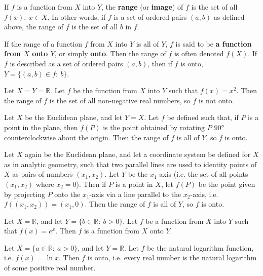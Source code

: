 \documentclass[12pt]{article}
\begin{document}
\begin{defn}
  If $f$ is a function from $X$ into $Y$, the \textbf{range} (or \textbf{image}) of
  $f$ is the set of all $f(x),\ x \in X$. In other words, if $f$ is a set of ordered
  pairs $(a,b)$ as defined above, the range of $f$ is the set of all $b$ in $f$.
\end{defn}

\begin{defn}
  If the range of a function $f$ from $X$ into $Y$ is all of $Y$, $f$ is said to be
  \textbf{a function from $X$ onto $Y$}, or simply \textbf{onto}. Then the range of
  $f$ is often denoted $f(X)$. If $f$ is described as a set of ordered pairs $(a,b)$,
  then if $f$ is onto, $Y = \{(a,b) \in f:\ b\}$.
\end{defn}

\begin{exm}
  Let $X = Y = \mathbb{R}$. Let $f$ be the function from $X$ into $Y$ such that $f(x)
  = x^2$. Then the range of $f$ is the set of all non-negative real numbers, so $f$
  is not onto.
\end{exm}

\begin{exm}
  Let $X$ be the Euclidean plane, and let $Y = X$. Let $f$ be defined such that, if
  $P$ is a point in the plane, then $f(P)$ is the point obtained by rotating $P$
  $90\degree$ counterclockwise about the origin. Then the range of $f$ is all of $Y$,
  so $f$ is onto.
\end{exm}

\begin{exm}
  Let $X$ again be the Euclidean plane, and let a coordinate system be defined for
  $X$ as in analytic geometry, such that two parallel lines are used to identity
  points of $X$ as pairs of numbers $(x_1,x_2)$. Let $Y$ be the $x_1$-axis (i.e. the
  set of all points $(x_1,x_2)$ where $x_2 = 0$). Then if $P$ is a point in $X$, let
  $f(P)$ be the point given by projecting $P$ onto the $x_1$-axis via a line parallel
  to the $x_2$-axis, i.e. $f((x_1,x_2)) = (x_1,0)$. Then the range of $f$ is all of
  $Y$, so $f$ is onto.
\end{exm}

\begin{exm}
  Let $X = \mathbb{R}$, and let $Y = \{b \in \mathbb{R}:\ b > 0\}$. Let $f$ be a
  function from $X$ into $Y$ such that $f(x) = e^x$. Then $f$ is a function from $X$
  onto $Y$.
\end{exm}

\begin{exm}
  Let $X = \{a \in \mathbb{R}:\ a > 0\}$, and let $Y = \mathbb{R}$. Let $f$ be the
  natural logarithm function, i.e. $f(x) = \ln x$. Then $f$ is onto, i.e. every real
  number is the natural logarithm of some positive real number.
\end{exm}
\end{document}
